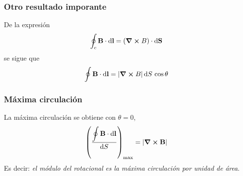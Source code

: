 \documentclass[12pt]{beamer}
\begin{document}
\begin{frame}
\frametitle{Otro resultado imporante}
De la expresión
\begin{align*}
\oint_{c} \vb{B} \cdot \dd{\vb{l}} = (\curl{B}) \cdot \dd{\vb{S}}
\end{align*}
\pause
se sigue que
\begin{align*}
\oint \vb{B} \cdot \dd{\vb{l}} = \abs{\curl{B}} \dd{S \, \cos \theta}
\end{align*}
\end{frame}
\begin{frame}
\frametitle{Máxima circulación}
La máxima circulación se obtiene con $\theta = 0$,
\begin{align*}
\left( \dfrac{\displaystyle \oint \vb{B} \cdot \dd{\vb{l}}}{\dd{S}} \right)_{\max} = \abs{\curl{\vb{B}}}
\end{align*}
Es decir: \emph{el módulo del rotacional es la máxima circulación por unidad de área}.
\end{frame}
\end{document}
